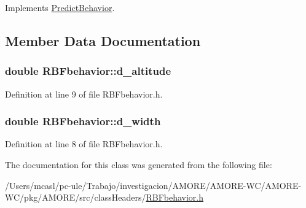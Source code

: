 Implements \hyperlink{class_predict_behavior_a9ef84360f73784248d994fa4707c1dde}{PredictBehavior}.



\subsection{Member Data Documentation}
\hypertarget{class_r_b_fbehavior_a831ab08f316756149ff37a92098f7033}{
\subsubsection[{d\_\-altitude}]{\setlength{\rightskip}{0pt plus 5cm}double {\bf RBFbehavior::d\_\-altitude}}}
\label{class_r_b_fbehavior_a831ab08f316756149ff37a92098f7033}


Definition at line 9 of file RBFbehavior.h.

\hypertarget{class_r_b_fbehavior_a6b37a2973f5e8390e37333e81de26077}{
\subsubsection[{d\_\-width}]{\setlength{\rightskip}{0pt plus 5cm}double {\bf RBFbehavior::d\_\-width}}}
\label{class_r_b_fbehavior_a6b37a2973f5e8390e37333e81de26077}


Definition at line 8 of file RBFbehavior.h.



The documentation for this class was generated from the following file:\begin{DoxyCompactItemize}
\item 
/Users/mcasl/pc-\/ule/Trabajo/investigacion/AMORE/AMORE-\/WC/AMORE-\/WC/pkg/AMORE/src/classHeaders/\hyperlink{_r_b_fbehavior_8h}{RBFbehavior.h}\end{DoxyCompactItemize}
